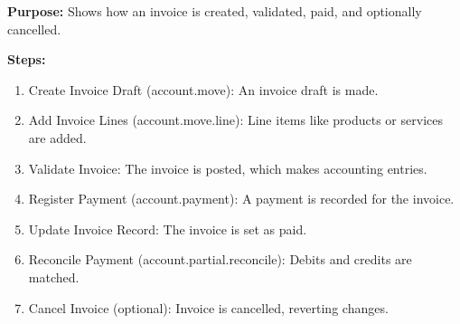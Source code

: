 \documentclass[11pt,a4paper]{article}
\begin{document}
\begin{minipage}{0.45\textwidth}
    \noindent\textbf{Purpose:} Shows how an invoice is created, 
    validated, paid, and optionally cancelled.
    \medskip

    \noindent\textbf{Steps:}
\begin{enumerate}
    \item Create Invoice Draft (account.move): An 
    invoice draft is made.
    \item Add Invoice Lines (account.move.line): Line items like products or services are added.
    \item Validate Invoice: The invoice is posted, 
    which makes accounting entries.
    \item Register Payment (account.payment): A 
    payment is recorded for the invoice.
    \item Update Invoice Record: The invoice is set 
    as paid.
    \item Reconcile Payment (account.partial.reconcile): Debits and credits are matched.
    \item Cancel Invoice (optional): Invoice is 
cancelled, reverting changes.
\end{enumerate}
\end{minipage}%
\hfill
\end{document}
